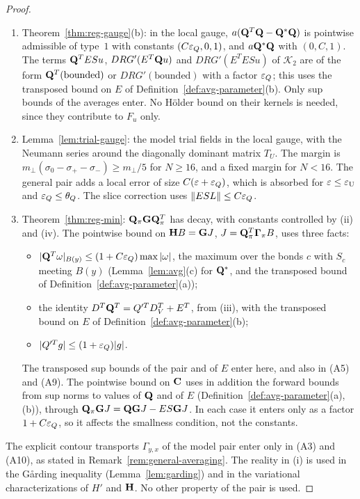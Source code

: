 \begin{proof}
\begin{enumerate}[label=(A\arabic*)]
\item Theorem~\ref{thm:reg-gauge}(b): in the local gauge, $a(\mathbf Q^T\mathbf Q-\mathbf Q^*\mathbf Q)$ is pointwise admissible of type~$1$ with constants $(C\varepsilon_Q,0,1)$, and $a\mathbf Q^*\mathbf Q$ with $(0,C,1)$. The terms $\mathbf Q^TESu$, $DRG'(E^T\mathbf Q u)$ and $DRG'(E^TESu)$ of $\mathcal K_2$ are of the form $\mathbf Q^T(\text{bounded})$ or $DRG'(\text{bounded})$ with a factor $\varepsilon_Q$; this uses the transposed bound on $E$ of Definition~\ref{def:avg-parameter}(b). Only sup bounds of the averages enter. No H\"older bound on their kernels is needed, since they contribute to $F_u$ only.
\item Lemma~\ref{lem:trial-gauge}: the model trial fields in the local gauge, with the Neumann series around the diagonally dominant matrix $T_U$. The margin is $m_\perp(\sigma_0-\sigma_+-\sigma_-)\ge m_\perp/5$ for $N\ge16$, and a fixed margin for $N<16$. The general pair adds a local error of size $C(\varepsilon+\varepsilon_Q)$, which is absorbed for $\varepsilon\le\varepsilon_{\rm U}$ and $\varepsilon_Q\le\theta_Q$. The slice correction uses $\|ESL\|\le C\varepsilon_Q$.
\item Theorem~\ref{thm:reg-min}: $\mathbf Q_\pi\mathbf G\mathbf Q_\pi^T$ has decay, with constants controlled by (ii) and (iv). The pointwise bound on $\mathbf H B=\mathbf G J$, $J=\mathbf Q_\pi^T\boldsymbol\Gamma_\pi B$, uses three facts:
  \begin{itemize}
  \item $|\mathbf Q^T\omega|_{B(y)}\le(1+C\varepsilon_Q)\max|\omega|$, the maximum over the bonds $c$ with $S_c$ meeting $B(y)$ (Lemma~\ref{lem:avg}(c) for $\mathbf Q^*$, and the transposed bound of Definition~\ref{def:avg-parameter}(a));
  \item the identity $D^T\mathbf Q^T=Q'^TD_V^T+E^T$, from (iii), with the transposed bound on $E$ of Definition~\ref{def:avg-parameter}(b);
  \item $|Q'^Tg|\le(1+\varepsilon_Q)|g|$.
  \end{itemize}
  The transposed sup bounds of the pair and of $E$ enter here, and also in (A5) and (A9). The pointwise bound on $\mathbf C$ uses in addition the forward bounds from sup norms to values of $\mathbf Q$ and of $E$ (Definition~\ref{def:avg-parameter}(a),(b)), through $\mathbf Q_\pi\mathbf G J=\mathbf Q\mathbf G J-ES\mathbf G J$. In each case it enters only as a factor $1+C\varepsilon_Q$, so it affects the smallness condition, not the constants.
\end{enumerate}
The explicit contour transports $\Gamma_{y,x}$ of the model pair enter only in (A3) and (A10), as stated in Remark~\ref{rem:general-averaging}. The reality in (i) is used in the G\aa rding inequality (Lemma~\ref{lem:garding}) and in the variational characterizations of $H'$ and $\mathbf H$. No other property of the pair is used.


\end{proof}
